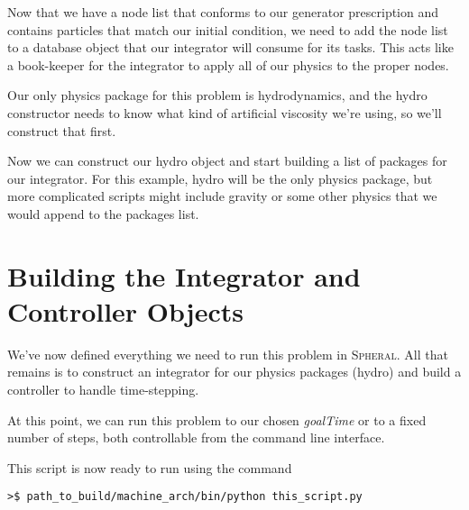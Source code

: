 \documentclass[11pt]{memoir}
\begin{document}
Now that we have a node list that conforms to our generator prescription and contains particles that match our initial condition, we need to add the node list to a database object that our integrator will consume for its tasks. This acts like a book-keeper for the integrator to apply all of our physics to the proper nodes.



Our only physics package for this problem is hydrodynamics, and the hydro constructor needs to know what kind of artificial viscosity we're using, so we'll construct that first.



Now we can construct our hydro object and start building a list of packages for our integrator. 
For this example, hydro will be the only physics package, but more complicated scripts might include gravity or some other physics that we would append to the packages list.



\section{Building the Integrator and Controller Objects}

We've now defined everything we need to run this problem in \textsc{Spheral}.
All that remains is to construct an integrator for our physics packages (hydro) and build a controller to handle time-stepping.





At this point, we can run this problem to our chosen \textit{goalTime} or to a fixed number of steps, both controllable from the command line interface.



This script is now ready to run using the command

\lstset{basicstyle=\small,style=myCustomShellStyle}

\begin{lstlisting}
>$ path_to_build/machine_arch/bin/python this_script.py
\end{lstlisting} 
\end{document}
